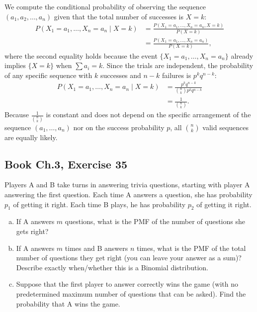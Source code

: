 \documentclass[11pt,a4paper]{article}
\begin{document}
We compute the conditional probability of observing the sequence $(a_1, a_2, \dots, a_n)$ given that the total number of successes is $X = k$:
\begin{align*}
P(X_1 = a_1, \dots, X_n = a_n \mid X = k) &= \frac{P(X_1 = a_1, \dots, X_n = a_n, X = k)}{P(X = k)} \\
&= \frac{P(X_1 = a_1, \dots, X_n = a_n)}{P(X = k)},
\end{align*}
where the second equality holds because the event $\{X_1 = a_1, \dots, X_n = a_n\}$ already implies $\{X = k\}$ when $\sum a_i = k$. Since the trials are independent, the probability of any specific sequence with $k$ successes and $n-k$ failures is $p^k q^{n-k}$:
\begin{align*}
P(X_1 = a_1, \dots, X_n = a_n \mid X = k) &= \frac{p^k q^{n-k}}{\binom{n}{k} p^k q^{n-k}} \\
&= \frac{1}{\binom{n}{k}}.
\end{align*}
Because $\frac{1}{\binom{n}{k}}$ is constant and does not depend on the specific arrangement of the sequence $(a_1, \dots, a_n)$ nor on the success probability $p$, all $\binom{n}{k}$ valid sequences are equally likely.

\vspace{10pt}
\subsection{Book Ch.3, Exercise 35}
\begin{tcolorbox}[title={Book Ch.3, Exercise 35}]
Players A and B take turns in answering trivia questions, starting with player A answering the first question. Each time A answers a question, she has probability $p_1$ of getting it right. Each time B plays, he has probability $p_2$ of getting it right.
\begin{enumerate}[(a)]
\item If A answers $m$ questions, what is the PMF of the number of questions she gets right?
\item If A answers $m$ times and B answers $n$ times, what is the PMF of the total number of questions they get right (you can leave your answer as a sum)? Describe exactly when/whether this is a Binomial distribution.
\item Suppose that the first player to answer correctly wins the game (with no predetermined maximum number of questions that can be asked). Find the probability that A wins the game.
\end{enumerate}
\end{tcolorbox}
\end{document}
